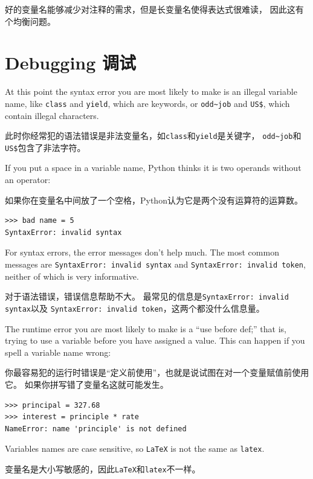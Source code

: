 \documentclass[10pt]{book}
\begin{document}
\begin{CJK}{UTF8}{gbsn}
好的变量名能够减少对注释的需求，但是长变量名使得表达式很难读，
因此这有个均衡问题。

\section{Debugging 调试}

At this point the syntax error you are most likely to make is
an illegal variable name, like {\tt class} and {\tt yield}, which
are keywords, or \verb"odd~job" and \verb"US$", which contain
illegal characters.

此时你经常犯的语法错误是非法变量名，如{\tt class}和{\tt yield}是关键字，
\verb"odd~job"和\verb"US$"包含了非法字符。

If you put a space in a variable name, Python thinks it is two
operands without an operator:

如果你在变量名中间放了一个空格，Python认为它是两个没有运算符的运算数。

\begin{verbatim}
>>> bad name = 5
SyntaxError: invalid syntax
\end{verbatim}
%
For syntax errors, the error messages don't help much.
The most common messages are {\tt SyntaxError: invalid syntax} and
{\tt SyntaxError: invalid token}, neither of which is very informative.

对于语法错误，错误信息帮助不大。
最常见的信息是{\tt SyntaxError: invalid syntax}以及
{\tt SyntaxError: invalid token}，这两个都没什么信息量。

The runtime error you are most likely to make is a ``use before
def;'' that is, trying to use a variable before you have assigned
a value.  This can happen if you spell a variable name wrong:

你最容易犯的运行时错误是``定义前使用''，也就是说试图在对一个变量赋值前使用它。
如果你拼写错了变量名这就可能发生。

\begin{verbatim}
>>> principal = 327.68
>>> interest = principle * rate
NameError: name 'principle' is not defined
\end{verbatim}
%
Variables names are case sensitive, so {\tt LaTeX} is not the
same as {\tt latex}.

变量名是大小写敏感的，因此{\tt LaTeX}和{\tt latex}不一样。


\end{CJK}
\end{document}
